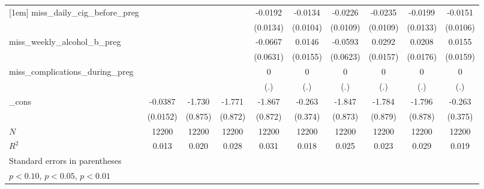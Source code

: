 \begin{table}[htbp]
\begin{tabular}{l*{9}{c}}
[1em]
miss\_daily\_cig\_before\_preg&                     &                     &                     &     -0.0192         &     -0.0134         &     -0.0226\sym{**} &     -0.0235\sym{**} &     -0.0199         &     -0.0151         \\
            &                     &                     &                     &    (0.0134)         &    (0.0104)         &    (0.0109)         &    (0.0109)         &    (0.0133)         &    (0.0106)         \\
[1em]
miss\_weekly\_alcohol\_b\_preg&                     &                     &                     &     -0.0667         &      0.0146         &     -0.0593         &      0.0292\sym{*}  &      0.0208         &      0.0155         \\
            &                     &                     &                     &    (0.0631)         &    (0.0155)         &    (0.0623)         &    (0.0157)         &    (0.0176)         &    (0.0159)         \\
[1em]
miss\_complications\_during\_preg&                     &                     &                     &           0         &           0         &           0         &           0         &           0         &           0         \\
            &                     &                     &                     &         (.)         &         (.)         &         (.)         &         (.)         &         (.)         &         (.)         \\
[1em]
\_cons      &     -0.0387\sym{**} &      -1.730\sym{**} &      -1.771\sym{**} &      -1.867\sym{**} &      -0.263         &      -1.847\sym{**} &      -1.784\sym{**} &      -1.796\sym{**} &      -0.263         \\
            &    (0.0152)         &     (0.875)         &     (0.872)         &     (0.872)         &     (0.374)         &     (0.873)         &     (0.879)         &     (0.878)         &     (0.375)         \\
\hline
\(N\)       &       12200         &       12200         &       12200         &       12200         &       12200         &       12200         &       12200         &       12200         &       12200         \\
\(R^{2}\)   &       0.013         &       0.020         &       0.028         &       0.031         &       0.018         &       0.025         &       0.023         &       0.029         &       0.019         \\
\hline\hline
\multicolumn{10}{l}{\footnotesize Standard errors in parentheses}\\
\multicolumn{10}{l}{\footnotesize \sym{*} \(p<0.10\), \sym{**} \(p<0.05\), \sym{***} \(p<0.01\)}\\
\end{tabular}
\end{table}
